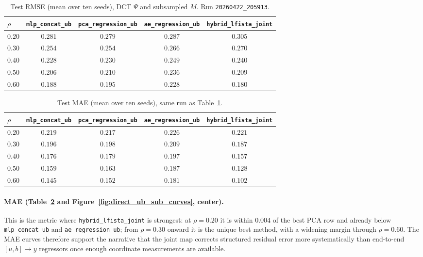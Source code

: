 \begin{table}[t]
  \centering
  \caption{Test RMSE (mean over ten seeds), DCT $\Psi$ and subsampled $M$. Run \texttt{20260422\_205913}.}
  \label{tab:direct_ub_dct_subsample_rmse}
  \small
  \begin{tabular}{@{}lcccc@{}}
    \toprule
    $\rho$ & \texttt{mlp\_concat\_ub} & \texttt{pca\_regression\_ub} & \texttt{ae\_regression\_ub} & \texttt{hybrid\_lfista\_joint} \\
    \midrule
    $0.20$ & $0.281$ & $\mathbf{0.279}$ & $0.287$ & $0.305$ \\
    $0.30$ & $\mathbf{0.254}$ & $\mathbf{0.254}$ & $0.266$ & $0.270$ \\
    $0.40$ & $\mathbf{0.228}$ & $0.230$ & $0.249$ & $0.240$ \\
    $0.50$ & $\mathbf{0.206}$ & $0.210$ & $0.236$ & $0.209$ \\
    $0.60$ & $0.188$ & $0.195$ & $0.228$ & $\mathbf{0.180}$ \\
    \bottomrule
  \end{tabular}
\end{table}

\begin{table}[t]
  \centering
  \caption{Test MAE (mean over ten seeds), same run as Table~\ref{tab:direct_ub_dct_subsample_rmse}.}
  \label{tab:direct_ub_dct_subsample_mae}
  \small
  \begin{tabular}{@{}lcccc@{}}
    \toprule
    $\rho$ & \texttt{mlp\_concat\_ub} & \texttt{pca\_regression\_ub} & \texttt{ae\_regression\_ub} & \texttt{hybrid\_lfista\_joint} \\
    \midrule
    $0.20$ & $0.219$ & $\mathbf{0.217}$ & $0.226$ & $0.221$ \\
    $0.30$ & $0.196$ & $0.198$ & $0.209$ & $\mathbf{0.187}$ \\
    $0.40$ & $0.176$ & $0.179$ & $0.197$ & $\mathbf{0.157}$ \\
    $0.50$ & $0.159$ & $0.163$ & $0.187$ & $\mathbf{0.128}$ \\
    $0.60$ & $0.145$ & $0.152$ & $0.181$ & $\mathbf{0.102}$ \\
    \bottomrule
  \end{tabular}
\end{table}

\paragraph{MAE (Table~\ref{tab:direct_ub_dct_subsample_mae} and Figure~\ref{fig:direct_ub_sub_curves}, center).}
This is the metric where \texttt{hybrid\_lfista\_joint} is strongest: at $\rho=0.20$ it is within $0.004$ of the best PCA row and already below \texttt{mlp\_concat\_ub} and \texttt{ae\_regression\_ub}; from $\rho=0.30$ onward it is the unique best method, with a widening margin through $\rho=0.60$.
The MAE curves therefore support the narrative that the joint map corrects structured residual error more systematically than end-to-end $[u,b]\to y$ regressors once enough coordinate measurements are available.


